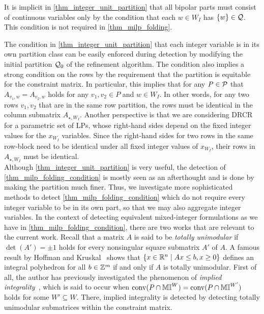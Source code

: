 \documentclass[pdflatex,sn-mathphys-num]{sn-jnl}%
\theoremstyle{thmstyleone}%
\theoremstyle{thmstylethree}%
\theoremstyle{thmstyletwo}%
\newcommand{\conv}{\mathrm{conv}}
\begin{document}
It is implicit in \cref{thm_integer_unit_partition} that all bipolar parts must consist of continuous variables only by the condition that each $w\in W_I$ has $\{w\}\in \mathcal{Q}$. This condition is not required in \cref{thm_milp_folding}.

The condition in \cref{thm_integer_unit_partition} that each integer variable is in its own partition class can be easily enforced during detection by modifying the initial partition $\mathcal{Q}_0$ of the refinement algorithm. The condition also implies a strong condition on the rows by the requirement that the partition is equitable for the constraint matrix. In particular, this implies that for any $P\in \mathcal{P}$ that $A_{v_1,w} = A_{v_2,w}$ holds for any $v_1,v_2\in P$ and $w\in W_I$. In other words, for any two rows $v_1,v_2$ that are in the same row partition, the rows must be identical in the column submatrix $A_{\star, W_I}$. Another perspective is that we are considering DRCR for a parametric set of LPs, whose right-hand sides depend on the fixed integer values for the $x_{W_I}$ variables. Since the right-hand sides for two rows in the same row-block need to be identical under all fixed integer values of $x_{W_I}$, their rows in $A_{\star,W_I}$ must be identical.\\

Although \cref{thm_integer_unit_partition} is very useful, the detection of \eqref{thm_milp_folding_condition} is mostly seen as an afterthought and is done by making the partition much finer. Thus, we investigate more sophisticated methods to detect \eqref{thm_milp_folding_condition} which do not require every integer variable to be in its own part, so that we may also aggregate integer variables. 
In the context of detecting equivalent mixed-integer formulations as we have in \eqref{thm_milp_folding_condition}, there are two works that are relevant to the current work. Recall that a matrix $A$ is said to be \emph{totally unimodular} if $\det(A')= \pm 1$ holds for every nonsingular square submatrix $A'$ of $A$. A famous result by Hoffman and Kruskal~\cite{HoffmanK56} shows that $\{x \in \mathbb{R}^n \mid A x \leq b, x\geq 0\}$ defines an integral polyhedron for all $b\in \mathbb{Z}^m$ if and only if $A$ is totally unimodular.
First of all, the author has previously investigated the phenomenon of \emph{implied integrality}~\cite{VanDerHulst2025}, which is said to occur when $\conv(P\cap \M^W) = \conv(P\cap \M^{W'})$ holds for some $W'\subseteq W$. There, implied integrality is detected by detecting totally unimodular submatrices within the constraint matrix.\\
\end{document}

